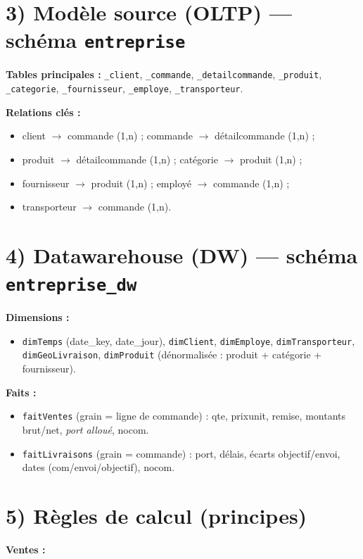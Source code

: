 \documentclass[a4paper,12pt]{article}
\begin{document}
\section*{3) Modèle source (OLTP) — schéma \texttt{entreprise}}
\textbf{Tables principales :} \texttt{\_client}, \texttt{\_commande}, \texttt{\_detailcommande}, \texttt{\_produit}, \texttt{\_categorie}, \texttt{\_fournisseur}, \texttt{\_employe}, \texttt{\_transporteur}.

\textbf{Relations clés :}
\begin{itemize}
  \item client $\rightarrow$ commande (1,n) ; commande $\rightarrow$ détailcommande (1,n) ;
  \item produit $\rightarrow$ détailcommande (1,n) ; catégorie $\rightarrow$ produit (1,n) ;
  \item fournisseur $\rightarrow$ produit (1,n) ; employé $\rightarrow$ commande (1,n) ;
  \item transporteur $\rightarrow$ commande (1,n).
\end{itemize}

\section*{4) Datawarehouse (DW) — schéma \texttt{entreprise\_dw}}
\textbf{Dimensions :}
\begin{itemize}
  \item \texttt{dimTemps} (date\_key, date\_jour), \texttt{dimClient}, \texttt{dimEmploye},
  \texttt{dimTransporteur}, \texttt{dimGeoLivraison}, \texttt{dimProduit} (dénormalisée : produit + catégorie + fournisseur).
\end{itemize}

\textbf{Faits :}
\begin{itemize}
  \item \texttt{faitVentes} (grain = ligne de commande) : qte, prixunit, remise, montants brut/net, \textit{port alloué}, nocom.
  \item \texttt{faitLivraisons} (grain = commande) : port, délais, écarts objectif/envoi, dates (com/envoi/objectif), nocom.
\end{itemize}

\section*{5) Règles de calcul (principes)}
\textbf{Ventes :}
\end{document}
